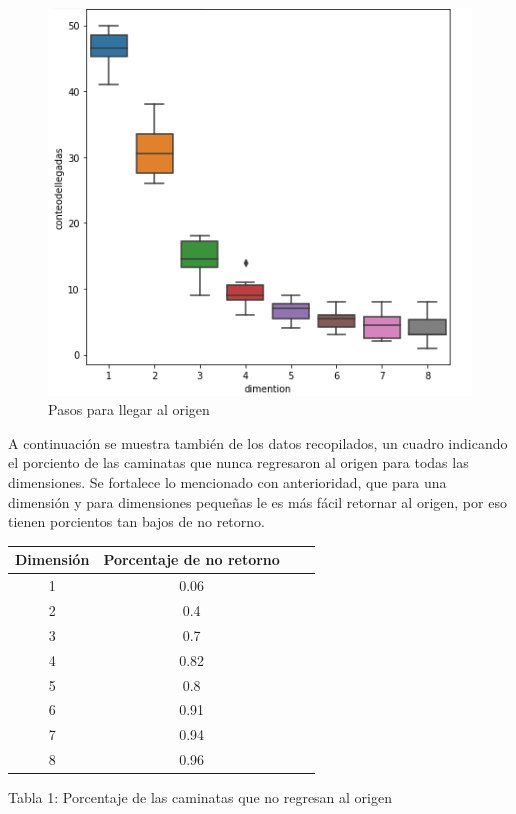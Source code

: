 \documentclass{article}
\begin{document}
\begin{figure}[H]
	\centering
	
	\includegraphics[scale=0.6]{Pasosdellegada.png}
	\caption{Pasos para llegar al origen}
	\label{fig:f2}
\end{figure}

A continuación se muestra también de los datos recopilados, un cuadro indicando el porciento de las caminatas que nunca regresaron al origen para todas las dimensiones. Se fortalece lo mencionado con anterioridad, que para una dimensión y para dimensiones pequeñas le es más fácil retornar al origen, por eso tienen porcientos tan bajos de no retorno.
\begin{center}
\begin{tabular}{|c|c|c|c|}
\hline 
Dimensión & Porcentaje de no retorno \\ 
\hline 
1 & 0.06 \\ 
\hline 
2 & 0.4 \\ 
\hline 
3 & 0.7 \\ 
\hline 
4 & 0.82 \\ 
\hline 
5 & 0.8 \\ 
\hline 
6 & 0.91 \\ 
\hline 
7 & 0.94 \\ 
\hline 
8 & 0.96 \\ 
\hline
\end{tabular}
\end{center}
\begin{center}
	Tabla 1: Porcentaje de las caminatas que no regresan al origen
\end{center}
\end{document}
